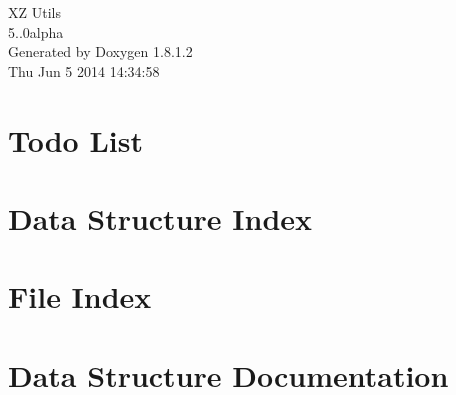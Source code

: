 \documentclass{book}
\begin{document}
\begin{titlepage}
\vspace*{7cm}
\begin{center}
{\Large X\-Z Utils \\[1ex]\large 5..\-0alpha }\\
\vspace*{1cm}
{\large Generated by Doxygen 1.8.1.2}\\
\vspace*{0.5cm}
{\small Thu Jun 5 2014 14:34:58}\\
\end{center}
\end{titlepage}
\clearemptydoublepage
{}
\tableofcontents
\clearemptydoublepage
{}
\chapter{Todo List}
\label{todo}

\chapter{Data Structure Index}

\chapter{File Index}

\chapter{Data Structure Documentation}















































\end{document}
